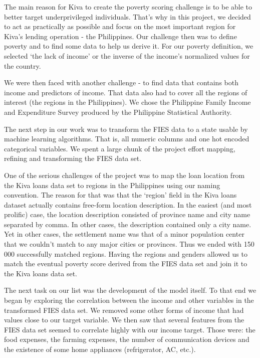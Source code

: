 \documentclass{article}
\begin{document}
The main reason for Kiva to create the poverty scoring challenge is to be able to better target underprivileged individuals. That’s why in this project, we decided to act as practically as possible and focus on the most important region for Kiva’s lending operation - the Philippines. Our challenge then was to define poverty and to find some data to help us derive it. For our poverty definition, we selected ‘the lack of income’ or the inverse of the income’s normalized values for the country.

We were then faced with another challenge - to find data that contains both income and predictors of income. That data also had to cover all the regions of interest (the regions in the Philippines). We chose the Philippine Family Income and Expenditure Survey produced by the Philippine Statistical Authority.

The next step in our work was to transform the FIES data to a state usable by machine learning algorithms. That is, all numeric columns and one hot encoded categorical variables. We spent a large chunk of the project effort mapping, refining and transforming the FIES data set.

One of the serious challenges of the project was to map the loan location from the Kiva loans data set to regions in the Philippines using our naming convention. The reason for that was that the ‘region’ field in the Kiva loans dataset actually contains free-form location description. In the easiest (and most prolific) case, the location description consisted of province name and city name separated by comma. In other cases, the description contained only a city name. Yet in other cases, the settlement name was that of a minor population center that we couldn’t match to any major cities or provinces. Thus we ended with 150 000 successfully matched regions. Having the regions and genders allowed us to match the eventual poverty score derived from the FIES data set and join it to the Kiva loans data set.

The next task on our list was the development of the model itself. To that end we began by exploring the correlation between the income and other variables in the transformed FIES data set. We removed some other forms of income that had values close to our target variable. We then saw that several features from the FIES data set seemed to correlate highly with our income target. Those were: the food expenses, the farming expenses, the number of communication devices and the existence of some home appliances (refrigerator, AC, etc.).
\end{document}
